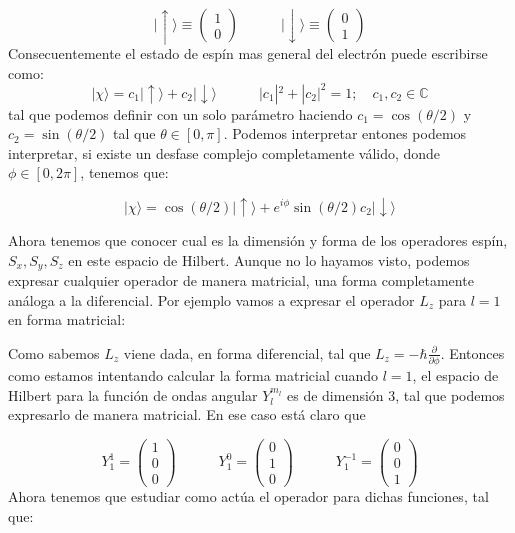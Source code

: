 \documentclass[12pt,a4paper]{article}
\numberwithin{equation}{section}
\numberwithin{figure}{section}
\newcommand{\parciales}[2]{\frac{\partial #1}{\partial #2}}
\newcommand{\tquad}{\quad \quad \quad}
\newcommand{\eup}{\mid \uparrow \rangle}
\newcommand{\edw}{\mid \downarrow \rangle}
\begin{document}
\begin{equation}
\eup \equiv \begin{pmatrix}
1 \\
0
\end{pmatrix} \tquad \edw \equiv \begin{pmatrix}
0 \\
1
\end{pmatrix}
\end{equation}
Consecuentemente el estado de espín mas general del electrón puede escribirse como:
\begin{equation}
| \chi \rangle = c_1 \eup + c_2 \edw \tquad | c_1 |^2 + |c_2 |^2 = 1; \quad c_1, c_2 \in \mathbb{C}
\end{equation}
tal que podemos definir con un solo parámetro haciendo $c_1 = \cos (\theta/2)$ y $c_2 = \sin ( \theta / 2)$ tal que $\theta \in [0,\pi]$. Podemos interpretar entones podemos interpretar, si existe un desfase complejo completamente válido, donde $\phi \in [0,2\pi]$, tenemos que:

\begin{equation}
| \chi \rangle = \cos (\theta/2) \eup + e^{i \phi} \sin(\theta/2) c_2 \edw 
\end{equation}

Ahora tenemos que conocer cual es la dimensión y forma de los operadores espín, $S_x,S_y,S_z$ en este espacio de Hilbert. Aunque no lo hayamos visto, podemos expresar cualquier operador de manera matricial, una forma completamente análoga a la diferencial. Por ejemplo vamos a expresar el operador $L_z$ para $l=1$ en forma matricial: \\



\hrulefill

Como sabemos $L_z$ viene dada, en forma diferencial, tal que $L_z = - \hbar \parciales{}{\phi}$. Entonces como estamos intentando calcular la forma matricial cuando $l=1$, el espacio de Hilbert para la función de ondas angular $Y_l^{m_l}$ es de dimensión 3, tal que podemos expresarlo de manera matricial. En ese caso está claro que

\begin{equation}
Y_1^1 = \begin{pmatrix}
1 \\ 0 \\ 0
\end{pmatrix}
\tquad Y_1^0 = \begin{pmatrix}
0 \\ 1 \\ 0
\end{pmatrix}
\tquad Y_1^{-1} = \begin{pmatrix}
0 \\ 0 \\ 1
\end{pmatrix} 
\end{equation}
Ahora tenemos que estudiar como actúa el operador para dichas funciones, tal que:
\end{document}

